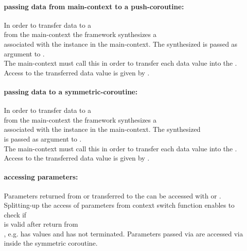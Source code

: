 \paragraph*{passing data from main-context to a push-coroutine:}
In order to transfer data to a\\
\pushcoro from the main-context the framework synthesizes a\\
\pullcoro associated with the \pushcoro instance in the main-context. The
synthesized \pullcoro is passed as argument to \corofunction.\\
The main-context must call this \pushcoroop in order to transfer each data value
into the \corofunction.\\
Access to the transferred data value is given by \pullcoroget.

\paragraph*{passing data to a symmetric-coroutine:}
In order to transfer data to a\\
\callcoro from the main-context the framework synthesizes a\\
\yieldcoro associated with the \callcoro instance in the main-context. The
synthesized\\
\yieldcoro is passed as argument to \corofunction.\\
The main-context must call this \callcoroop in order to transfer each data value
into the \corofunction.\\
Access to the transferred data value is given by \yieldcoroget.

\paragraph*{accessing parameters:}
Parameters returned from or transferred to the \corofunction can be accessed
with \pullcoroget or \yieldcoroget.\\
\newline
Splitting-up the access of parameters from context switch function enables to
check if\\
\pullcoro is valid after return from\\
\pullcoroop, e.g. \pullcoro has values and \corofunction has not terminated.
Parameters passed via \callcoro are accessed via\\
\yieldcoroget inside the symmetric coroutine.

